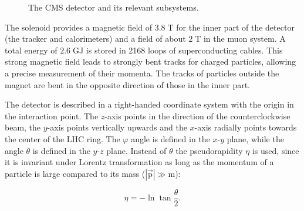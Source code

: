 \begin{figure}[htbp!]
  \begin{center}

\caption{The CMS detector and its relevant subsystems.~\cite{Collaboration:1433717}
  \label{fig:det_CMS}}
  \end{center}
\end{figure}


The solenoid provides a magnetic field of $3.8 \;\si{\tesla}$ for the inner part of the detector (the tracker and calorimeters) and a field of about $2 \;\si{\tesla}$ in the muon system.
A total energy of $2.6 \;\si{\giga \joule}$ is stored in 2168 loops of superconducting cables.
This strong magnetic field leads to strongly bent tracks for charged particles, allowing a precise measurement of their momenta. 
The tracks of particles outside the magnet are bent in the opposite direction of those in the inner part.

The detector is described in a right-handed coordinate system with the origin in the interaction point.
The $z$-axis points in the direction of the counterclockwise beam, the $y$-axis points vertically upwards and the $x$-axis radially points towards the center of the LHC ring.
The $\varphi$ angle is defined in the $x$-$y$ plane, while the angle $\theta$ is defined in the $y$-$z$ plane. Instead of $\theta$ the pseudorapidity $\eta$ is used, since it is invariant under Lorentz transformation as long
as the momentum of a particle is large compared to its mass ($|\vec{\mathrm{p}}|\gg \mathrm{m}$):

\begin{equation}
\eta = -\ln{\tan{\frac{\theta}{2}}}.
\end{equation}

